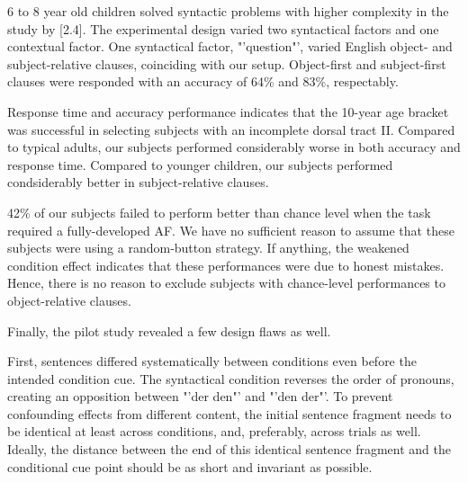 6 to 8 year old children solved syntactic problems with higher complexity in the study by [2.4].
The experimental design varied two syntactical factors and one contextual factor.
One syntactical factor, "'question"', varied English object- and subject-relative clauses, coinciding with our setup.
Object-first and subject-first clauses were responded with an accuracy of 64\% and 83\%, respectably.

Response time and accuracy performance indicates that the 10-year age bracket was successful in selecting subjects with an incomplete dorsal tract II.
Compared to typical adults, our subjects performed considerably worse in both accuracy and response time.
Compared to younger children, our subjects performed condsiderably better in subject-relative clauses.

42\% of our subjects failed to perform better than chance level when the task required a fully-developed AF.
We have no sufficient reason to assume that these subjects were using a random-button strategy.
If anything, the weakened condition effect indicates that these performances were due to honest mistakes.
Hence, there is no reason to exclude subjects with chance-level performances to object-relative clauses.


Finally, the pilot study revealed a few design flaws as well.

First, sentences differed systematically between conditions even before the intended condition cue.
The syntactical condition reverses the order of pronouns, creating an opposition between "'der den"' and "'den der"'.
To prevent confounding effects from different content, the initial sentence fragment needs to be identical at least across conditions, and, preferably, across trials as well.
Ideally, the distance between the end of this identical sentence fragment and the conditional cue point should be as short and invariant as possible.

